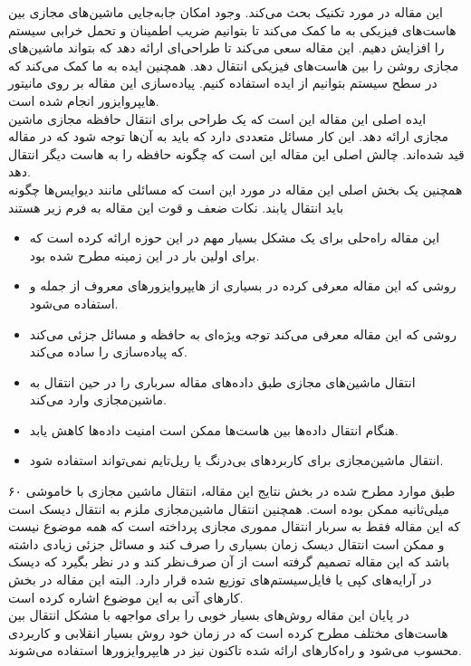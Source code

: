 \documentclass[a4paper, 12pt]{article}
\title{\lr{Live Migration Of Virtual Machines}}
\author{حسین افکار}
\begin{document}
\maketitle
این مقاله در مورد تکنیک
بحث می‌کند.
وجود امکان جابه‌جایی ماشین‌های مجازی بین هاست‌های فیزیکی به ما کمک می‌کند تا بتوانیم
ضریب اطمینان و تحمل خرابی سیستم را افزایش دهیم.
این مقاله سعی می‌کند تا طراحی‌ای ارائه دهد که بتواند ماشین‌های مجازی روشن را بین هاست‌های فیزیکی
انتقال دهد.
همچنین ایده
به ما کمک می‌کند که در سطح سیستم بتوانیم از ایده
استفاده کنیم.
پیاده‌سازی این مقاله بر روی مانیتور هایپروایزور
انجام شده است. \\
ایده اصلی این مقاله‌ این است که یک طراحی برای انتقال حافظه مجازی ماشین مجازی ارائه دهد.
این کار مسائل متعددی دارد که باید به آن‌ها توجه شود که در مقاله قید شده‌اند.
چالش اصلی این مقاله این است که چگونه حافظه را به هاست دیگر انتقال دهد. \\
همچنین یک بخش اصلی این مقاله در مورد این است که مسائلی مانند دیوایس‌ها چگونه باید انتقال یابند.
نکات ضعف و قوت این مقاله به فرم زیر هستند
\begin{itemize}
    \item این مقاله‌ راه‌حلی برای یک مشکل بسیار مهم در این حوزه ارائه کرده است که برای
    اولین بار در این زمینه مطرح شده بود.
    \item روشی که این مقاله معرفی کرده در بسیاری از هایپروایزور‌های معروف از جمله
    و
    استفاده می‌شود.
    \item روشی که این مقاله معرفی می‌کند توجه ویژه‌ای به حافظه و مسائل جزئی می‌کند
    که پیاده‌سازی را ساده می‌کند.
    \item انتقال ماشین‌های مجازی طبق داده‌های مقاله سرباری را در حین انتقال به ماشین‌مجازی وارد می‌کند.
    \item هنگام انتقال داده‌ها بین هاست‌ها ممکن است امنیت داده‌ها کاهش یابد.
    \item انتقال ماشین‌مجازی برای کاربرد‌های بی‌درنگ یا ریل‌تایم نمی‌تواند استفاده شود.
\end{itemize}
طبق موارد مطرح شده در بخش نتایج این مقاله، انتقال ماشین مجازی با خاموشی ۶۰ میلی‌ثانیه ممکن بوده است.
همچنین انتقال ماشین‌‌مجازی ملزم به انتقال دیسک است که این مقاله فقط به سربار انتقال مموری‌ مجازی پرداخته است
که همه موضوع نیست و ممکن است انتقال دیسک زمان بسیاری را صرف کند و مسائل جزئی زیادی داشته باشد
که این مقاله تصمیم گرفته است از آن صرف‌نظر کند و در نظر بگیرد که دیسک در آرایه‌های
کپی یا فایل‌سیستم‌های توزیع شده قرار دارد. البته این مقاله در بخش کار‌های آتی به این موضوع اشاره کرده است. \\
در پایان این مقاله روش‌های بسیار خوبی را برای مواجهه با مشکل انتقال بین‌ هاست‌های مختلف مطرح کرده است
که در زمان‌ خود روش ‌بسیار انقلابی و کاربردی محسوب می‌شود و راه‌کار‌های ارائه شده تاکنون نیز در
هایپروایزور‌ها استفاده می‌شوند.
\end{document}
